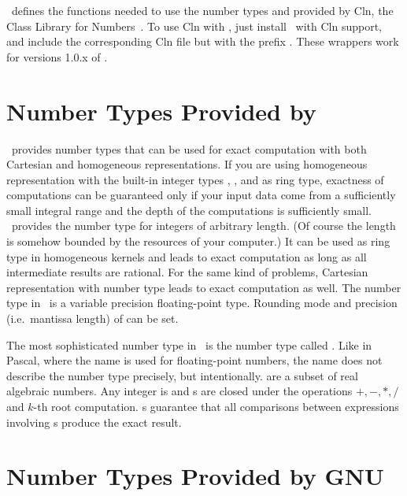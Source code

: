 
\cgal\ defines the functions needed to use the number types 
and  provided by {\sc Cln}, the Class Library for
Numbers~\cite{cln}.  To use {\sc Cln} with \cgal, just install \cgal\ with
{\sc Cln} support, and include the corresponding {\sc Cln} file but with the
prefix .  These wrappers work for versions 1.0.x of .


\section{Number Types Provided by \leda}
\label{leda-nt}

\leda\ provides number types that can be used for exact computation 
with both Cartesian and homogeneous representations.  If you are using
homogeneous representation with the built-in integer types
, , and  as ring type, exactness of
computations can be guaranteed only if your input data come from a
sufficiently small integral range and the depth of the computations is
sufficiently small.  \leda\ provides the number type  for
integers of arbitrary length. (Of course the length is
somehow bounded by the resources of your computer.)  It can be used as
ring type in homogeneous kernels and leads to exact
computation as long as all intermediate results are rational.  For the
same kind of problems, Cartesian representation with number type
 leads to exact computation as well.
The number type  in \leda\ is a variable precision
floating-point type. Rounding mode and precision (i.e.\ mantissa length) of
 can be set. 

The most sophisticated number type in \leda\ is the number type called
. Like in Pascal, where the name  is used for
floating-point numbers, the name  does not describe the
number type precisely, but intentionally.  
 are a subset of real algebraic
numbers.  Any integer is  and s are closed under
the operations $+,-,*,/$ and $k$-th root computation. 
s guarantee that
all comparisons between expressions involving s produce the
exact result.

\section{Number Types Provided by GNU}

